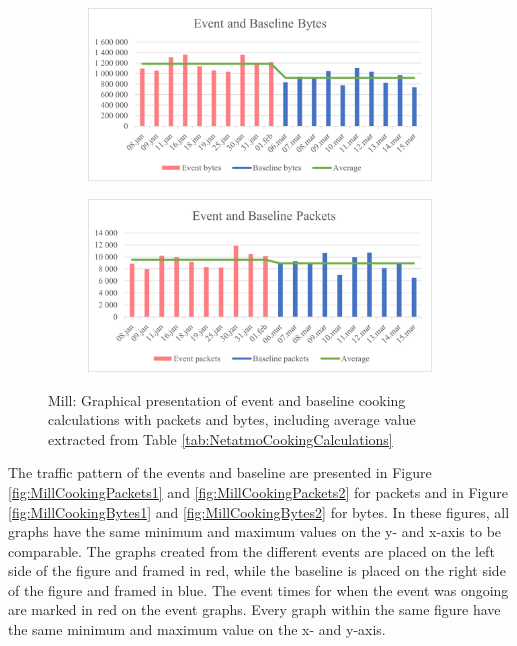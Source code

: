 \begin{figure}[H]
    \centering
    \begin{subfigure}{0.8\textwidth}
        \centering
        \includegraphics[width=1\hsize]{figures/Mill_Cooking_Calculations_Bytes.png} 
    \end{subfigure}
    \begin{subfigure}{0.8\textwidth}
        \centering
        \includegraphics[width=1\hsize]{figures/Mill_Cooking_Calculations_Packets.png} 
    \end{subfigure}
    \caption{Mill: Graphical presentation of event and baseline cooking calculations with packets and bytes, including average value extracted from Table \ref{tab:NetatmoCookingCalculations}}
    \label{fig:MillCookingCalculations}
\end{figure}

The traffic pattern of the events and baseline are presented in Figure \ref{fig:MillCookingPackets1} and \ref{fig:MillCookingPackets2} for packets and in Figure \ref{fig:MillCookingBytes1} and \ref{fig:MillCookingBytes2} for bytes. In these figures, all graphs have the same minimum and maximum values on the y- and x-axis to be comparable. The graphs created from the different events are placed on the left side of the figure and framed in red, while the baseline is placed on the right side of the figure and framed in blue. The event times for when the event was ongoing are marked in red on the event graphs. Every graph within the same figure have the same minimum and maximum value on the x- and y-axis. 

